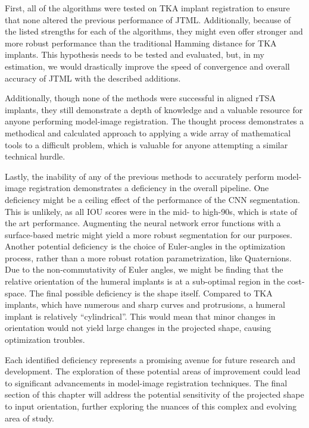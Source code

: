 First, all of the algorithms were tested on TKA implant registration to ensure that none altered the previous performance of JTML.
Additionally, because of the listed strengths for each of the algorithms, they might even offer stronger and more robust performance than the traditional Hamming distance for TKA implants.
This hypothesis needs to be tested and evaluated, but, in my estimation, we would drastically improve the speed of convergence and overall accuracy of JTML with the described additions.

Additionally, though none of the methods were successful in aligned rTSA implants, they still demonstrate a depth of knowledge and a valuable resource for anyone performing model-image registration.
The thought process demonstrates a methodical and calculated approach to applying a wide array of mathematical tools to a difficult problem, which is valuable for anyone attempting a similar technical hurdle.

Lastly, the inability of any of the previous methods to accurately perform model-image registration demonstrates a deficiency in the overall pipeline.
One deficiency might be a ceiling effect of the performance of the CNN segmentation.
This is unlikely, as all IOU scores were in the mid- to high-90s, which is state of the art performance.
Augmenting the neural network error functions with a surface-based metric might yield a more robust segmentation for our purposes.
Another potential deficiency is the choice of Euler-angles in the optimization process, rather than a more robust rotation parametrization, like Quaternions.
Due to the non-commutativity of Euler angles, we might be finding that the relative orientation of the humeral implants is at a sub-optimal region in the cost-space.
The final possible deficiency is the shape itself.
Compared to TKA implants, which have numerous and sharp curves and protrusions, a humeral implant is relatively ``cylindrical''.
This would mean that minor changes in orientation would not yield large changes in the projected shape, causing optimization troubles.

Each identified deficiency represents a promising avenue for future research and development.
The exploration of these potential areas of improvement could lead to significant advancements in model-image registration techniques.
The final section of this chapter will address the potential sensitivity of the projected shape to input orientation, further exploring the nuances of this complex and evolving area of study.


